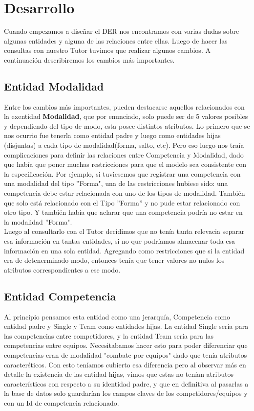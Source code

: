 \section{Desarrollo}

Cuando empezamos a diseñar el DER nos encontramos con varias dudas sobre algunas entidades y alguna de las
relaciones entre ellas. Luego de hacer las consultas con nuestro Tutor tuvimos que realizar algunos cambios. A continuaci\'on describiremos los cambios m\'as importantes.

\subsection{Entidad Modalidad}

Entre los cambios más importantes, pueden destacarse aquellos relacionados con la exentidad \textbf{Modalidad}, que por enunciado, solo puede ser de 5 valores posibles y dependiendo del tipo de modo, esta posee distintos atributos. Lo primero que se nos ocurrio fue tenerla como entidad padre y luego como entidades hijas (disjuntas) a cada tipo de modalidad(forma, salto, etc).
Pero eso luego nos tra\'ia complicaciones para definir las relaciones entre Competencia y Modalidad, dado que había que poner muchas restricciones para que el modelo sea consistente con la especificación. 
Por ejemplo, si tuviesemos que registrar una competencia con una modalidad del tipo ''Forma", una de las restricciones hubiese sido: una competencia debe estar relacionada con uno de los tipos de modalidad. También que solo está relacionado con el Tipo ''Forma'' y no pude estar relacionado con otro tipo. 
Y también había que aclarar que una competencia podría no estar en la modalidad ''Forma". \\

Luego al consultarlo con el Tutor decidimos que no tenía tanta relevacia separar esa información en tantas entidades, si no que podr\'iamos almacenar toda esa información en una sola entidad. Agregando como restricciones que si la entidad era de detenerminado modo, entonces tenía que tener valores no nulos los atributos correspondientes a ese modo. \\

\subsection{Entidad Competencia}


Al principio pensamos esta entidad como una jerarqu\'ia, Competencia como entidad padre y Single y Team como entidades hijas. La entidad Single ser\'ia para las competencias entre competidores, y la entidad Team ser\'ia para las competencias entre equipos. Necesitabamos hacer esto para poder diferenciar que competencias eran de modalidad "combate por equipos" dado que tenía atributos caracter\'sticos. Con esto teníamos cubierto esa diferencia pero al observar m\'as en detalle la existencia de las entidad hijas, vimos que estas no tenían atributos característicos con respecto a su identidad padre, y que en definitiva al pasarlas a la base de datos solo guardar\'ian los campos claves de los competidores/equipos y con un Id de competencia relacionado.\\

